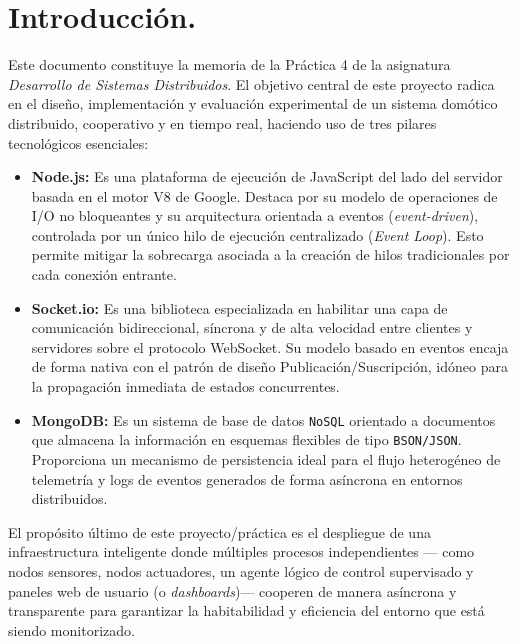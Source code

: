 \documentclass[a4paper,12pt]{article}
\begin{document}
	\tableofcontents
	\newpage %
	
	
	\section{Introducción.}	
		Este documento constituye la memoria de la Práctica 4 de la asignatura \textit{Desarrollo de Sistemas Distribuidos}. El objetivo central de este proyecto radica en el diseño, implementación y evaluación experimental de un sistema domótico distribuido, cooperativo y en tiempo real, haciendo uso de tres pilares tecnológicos esenciales:
		
		\begin{itemize}
			\item \textbf{Node.js:} Es una plataforma de ejecución de JavaScript del lado del servidor basada en el motor V8 de Google. Destaca por su modelo de operaciones de I/O no bloqueantes y su arquitectura orientada a eventos (\textit{event-driven}), controlada por un único hilo de ejecución centralizado (\textit{Event Loop}). Esto permite mitigar la sobrecarga asociada a la creación de hilos tradicionales por cada conexión entrante.
			
			\item \textbf{Socket.io:} Es una biblioteca especializada en habilitar una capa de comunicación bidireccional, síncrona y de alta velocidad entre clientes y servidores sobre el protocolo WebSocket. Su modelo basado en eventos encaja de forma nativa con el patrón de diseño Publicación/Suscripción, idóneo para la propagación inmediata de estados concurrentes.
			
			\item \textbf{MongoDB:} Es un sistema de base de datos \texttt{NoSQL} orientado a documentos que almacena la información en esquemas flexibles de tipo \texttt{BSON/JSON}. Proporciona un mecanismo de persistencia ideal para el flujo heterogéneo de telemetría y logs de eventos generados de forma asíncrona en entornos distribuidos.
		\end{itemize}
		
		El propósito último de este proyecto/práctica es el despliegue de una infraestructura inteligente donde múltiples procesos independientes — como nodos sensores, nodos actuadores, un agente lógico de control supervisado y paneles web de usuario (o \textit{dashboards})— cooperen de manera asíncrona y transparente para garantizar la habitabilidad y eficiencia del entorno que está siendo monitorizado.
		
\end{document}

